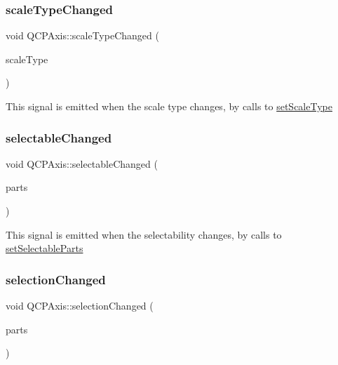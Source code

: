 \subsubsection{\texorpdfstring{scale\+Type\+Changed}{scaleTypeChanged}}
{\footnotesize\ttfamily void Q\+C\+P\+Axis\+::scale\+Type\+Changed (\begin{DoxyParamCaption}\item[{\mbox{\hyperlink{class_q_c_p_axis_a36d8e8658dbaa179bf2aeb973db2d6f0}{Q\+C\+P\+Axis\+::\+Scale\+Type}}}]{scale\+Type }\end{DoxyParamCaption})\hspace{0.3cm}{\ttfamily [signal]}}

This signal is emitted when the scale type changes, by calls to \mbox{\hyperlink{class_q_c_p_axis_adef29cae617af4f519f6c40d1a866ca6}{set\+Scale\+Type}} \mbox{\label{class_q_c_p_axis_aa5ff1fd851139028a3bb4efcb31de9fc}} 
\subsubsection{\texorpdfstring{selectable\+Changed}{selectableChanged}}
{\footnotesize\ttfamily void Q\+C\+P\+Axis\+::selectable\+Changed (\begin{DoxyParamCaption}\item[{const Q\+C\+P\+Axis\+::\+Selectable\+Parts \&}]{parts }\end{DoxyParamCaption})\hspace{0.3cm}{\ttfamily [signal]}}

This signal is emitted when the selectability changes, by calls to \mbox{\hyperlink{class_q_c_p_axis_a513f9b9e326c505d9bec54880031b085}{set\+Selectable\+Parts}} \mbox{\label{class_q_c_p_axis_a62b598abeee7174a05f9d542cc85b1f5}} 
\subsubsection{\texorpdfstring{selection\+Changed}{selectionChanged}}
{\footnotesize\ttfamily void Q\+C\+P\+Axis\+::selection\+Changed (\begin{DoxyParamCaption}\item[{const Q\+C\+P\+Axis\+::\+Selectable\+Parts \&}]{parts }\end{DoxyParamCaption})\hspace{0.3cm}{\ttfamily [signal]}}

